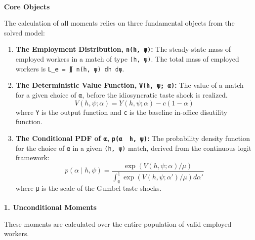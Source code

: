 \documentclass[
  11pt,
  letterpaper,
  DIV=11,
  numbers=noendperiod]{scrartcl}
\makeatletter
\let\oldparagraph\paragraph
\renewcommand{\paragraph}{
    \@ifstar
      \xxxParagraphStar
      \xxxParagraphNoStar
  }
\newcommand{\xxxParagraphStar}[1]{\oldparagraph*{#1}\mbox{}}
\newcommand{\xxxParagraphNoStar}[1]{\oldparagraph{#1}\mbox{}}
\makeatother
\begin{document}
\paragraph{\texorpdfstring{\textbf{Core
Objects}}{Core Objects}}\label{core-objects}

The calculation of all moments relies on three fundamental objects from
the solved model:

\begin{enumerate}
\def\labelenumi{\arabic{enumi}.}
\item
  \textbf{The Employment Distribution, \texttt{n(h,\ ψ)}:} The
  steady-state mass of employed workers in a match of type
  \texttt{(h,\ ψ)}. The total mass of employed workers is
  \texttt{L\_e\ =\ ∬\ n(h,\ ψ)\ dh\ dψ}.
\item
  \textbf{The Deterministic Value Function, \texttt{V(h,\ ψ;\ α)}:} The
  value of a match for a given choice of \texttt{α}, before the
  idiosyncratic taste shock is realized.
  \[ V(h, ψ; \alpha) = Y(h, \psi; \alpha) - c(1-\alpha) \] where
  \texttt{Y} is the output function and \texttt{c} is the baseline
  in-office disutility function.
\item
  \textbf{The Conditional PDF of \texttt{α},
  \texttt{p(α\ \textbar{}\ h,\ ψ)}:} The probability density function
  for the choice of \texttt{α} in a given \texttt{(h,\ ψ)} match,
  derived from the continuous logit framework:
  \[ p(\alpha \mid h, \psi) = \frac{\exp(V(h, \psi; \alpha) / \mu)}{\int_0^1 \exp(V(h, \psi; \alpha') / \mu) d\alpha'} \]
  where \texttt{μ} is the scale of the Gumbel taste shocks.
\end{enumerate}

\paragraph{\texorpdfstring{\textbf{1. Unconditional
Moments}}{1. Unconditional Moments}}\label{unconditional-moments}

These moments are calculated over the entire population of valid
employed workers.
\end{document}
